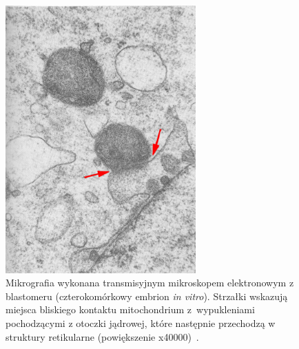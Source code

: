 \begin{figure}[!ht]
  \centering
  \includegraphics[width=0.65\textwidth,angle=90]{rysunki/rozdzial_1/MAM_electro_1}
  \caption[Miejsca kontaktu mito-ER w blastomerach człowieka]{Mikrografia wykonana transmisyjnym mikroskopem elektronowym z blastomeru (czterokomórkowy embrion \emph{in vitro}). Strzałki wskazują miejsca bliskiego kontaktu mitochondrium z~wypukleniami pochodzącymi z otoczki jądrowej, które następnie przechodzą w struktury retikularne (powiększenie x40000)~\cite{Pereda1992}.}
  \label{fig:MAMelectro1}
\end{figure}



